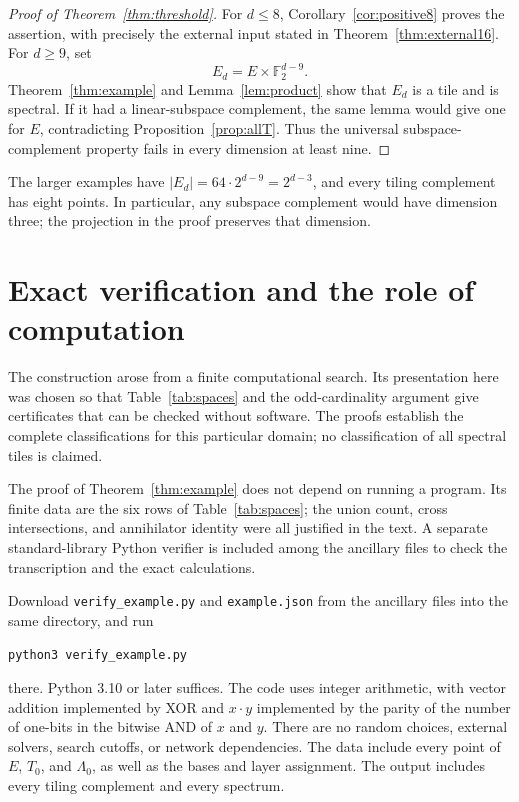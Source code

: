 \documentclass[11pt]{article}
\numberwithin{equation}{section}
\theoremstyle{definition}
\theoremstyle{remark}\newtheorem{remark}[theorem]{Remark}
\newcommand{\F}{\mathbb F_2}
\begin{document}
\begin{proof}[Proof of Theorem~\ref{thm:threshold}]
For $d\le8$, Corollary~\ref{cor:positive8} proves the assertion,
with precisely the external input stated in
Theorem~\ref{thm:external16}. For $d\ge9$, set
\[
 E_d=E\times\F^{d-9}.
\]
Theorem~\ref{thm:example} and Lemma~\ref{lem:product} show that $E_d$
is a tile and is spectral. If it had a linear-subspace complement, the
same lemma would give one for $E$, contradicting
Proposition~\ref{prop:allT}. Thus the universal subspace-complement
property fails in every dimension at least nine.
\end{proof}
The larger examples have $|E_d|=64\cdot2^{d-9}=2^{d-3}$, and every
tiling complement has eight points. In particular, any subspace
complement would have dimension three; the projection in the proof
preserves that dimension.

\section{Exact verification and the role of computation}\label{sec:verification}
The construction arose from a finite computational search. Its presentation
here was chosen so that Table~\ref{tab:spaces} and the odd-cardinality
argument give certificates that can be checked without software. The
proofs establish the complete classifications for this particular domain;
no classification of all spectral tiles is claimed.

The proof of Theorem~\ref{thm:example} does not depend on running a
program. Its finite data are the six rows of Table~\ref{tab:spaces};
the union count, cross intersections, and annihilator identity were all
justified in the text. A separate standard-library Python verifier is
included among the ancillary files to check the transcription and the
exact calculations.

Download \texttt{verify\_example.py} and \texttt{example.json} from the
ancillary files into the same directory, and run
\begin{center}\texttt{python3 verify\_example.py}\end{center}
there. Python 3.10 or later
suffices. The code uses integer arithmetic, with vector addition implemented
by XOR and $x\cdot y$ implemented by the parity of the number of one-bits
in the bitwise AND of $x$ and $y$. There are no random choices, external
solvers, search cutoffs, or network dependencies. The data include every
point of $E$, $T_0$, and $\Lambda_0$, as well as the bases and layer
assignment. The output includes every tiling complement and every spectrum.
\end{document}
